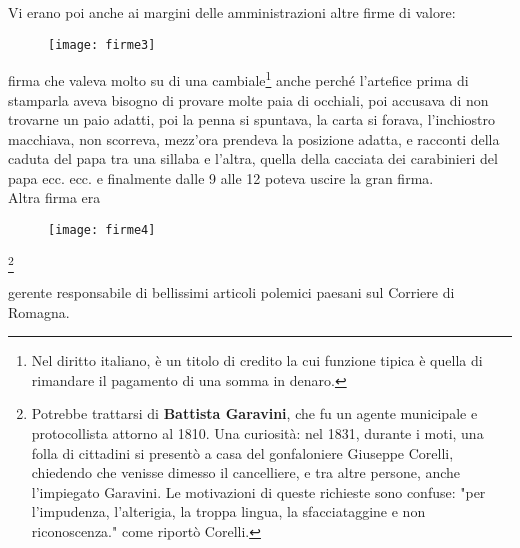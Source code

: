 \normalfont
\vspace{2cm}

\indent Vi erano poi anche ai margini delle amministrazioni altre firme di valore:
	
	\begin{figure}[htb]
	    \centering
	    \vspace{-0.4cm}
	    \texttt{[image: firme3]}
	    \caption*{\label{fig:firme3}}
	    \vspace{-0.7cm}
	\end{figure}
	

firma che valeva molto su di una cambiale\footnote{Nel diritto italiano, è un titolo di credito la cui funzione tipica è quella di rimandare il pagamento di una somma in denaro.} anche perché l'artefice prima di stamparla aveva bisogno di provare molte paia di occhiali, poi accusava di non trovarne un paio adatti, poi la penna si spuntava, la carta si forava, l'inchiostro macchiava, non scorreva, mezz'ora prendeva la posizione adatta, e racconti della caduta del papa tra una sillaba e l'altra, quella della cacciata dei carabinieri del papa ecc. ecc. e finalmente dalle 9 alle 12 poteva uscire la gran firma. \\

\indent Altra firma era

	\begin{figure}[htb]
	    \centering
	    \vspace{-0.3cm}
	    \texttt{[image: firme4]}
	    
	    \caption*{\label{fig:firme4}}
	    \vspace{-1.6cm}
	\end{figure}\footnote{Potrebbe trattarsi di \textbf{Battista Garavini}, che fu un agente municipale  e protocollista attorno al 1810. Una curiosità: nel 1831, durante i moti, una folla di cittadini si presentò a casa del gonfaloniere Giuseppe Corelli, chiedendo che venisse dimesso il cancelliere,  e tra altre persone, anche l'impiegato Garavini. Le motivazioni di queste richieste sono confuse: "per l'impudenza, l'alterigia, la troppa lingua, la sfacciataggine e non riconoscenza." come riportò Corelli.}

	
\indent gerente responsabile di bellissimi articoli polemici paesani sul Corriere di Romagna.



